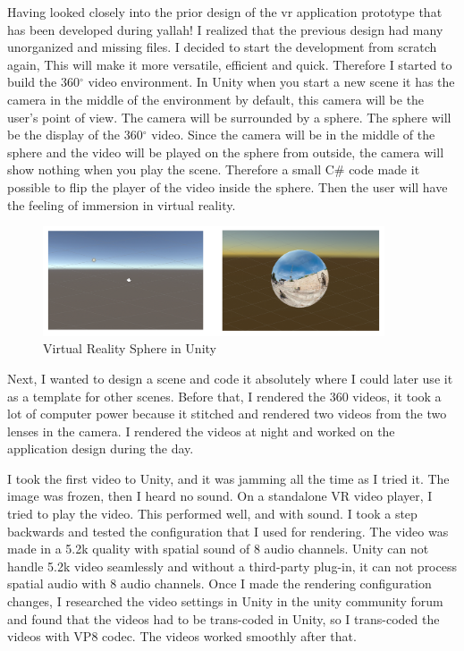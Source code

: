  Having looked closely into the prior design of the \acrshort{vr} application prototype that has been developed during \acrshort{yallah!} I realized that the previous design had many unorganized and missing files. I decided to start the development from scratch again, This will make it more versatile, efficient and quick. Therefore I started to build the 360$^{\circ}$ video environment. In Unity when you start a new scene it has the camera in the middle of the environment by default, this camera will be the user's point of view. The camera will be surrounded by a sphere. The sphere will be the display of the 360$^{\circ}$ video. Since the camera will be in the middle of the sphere and the video will be played on the sphere from outside, the camera will show nothing when you play the scene. Therefore a small C\# code made it possible to flip the player of the video inside the sphere. Then the user will have the feeling of immersion in virtual reality. 
\begin{figure}[ht]
    \centering
    \includegraphics[width=0.90\textwidth]{images/sphere.png}
    \caption{Virtual Reality Sphere in Unity }
    \label{fig:sphere}
\end{figure}


Next, I wanted to design a scene and code it absolutely where I could later use it as a template for other scenes. Before that, I rendered the 360 videos, it took a lot of computer power because it stitched and rendered two videos from the two lenses in the camera. I rendered the videos at night and worked on the application design during the day.

I took the first video to Unity, and it was jamming all the time as I tried it. The image was frozen, then I heard no sound. On a standalone VR video player, I tried to play the video. This performed well, and with sound. I took a step backwards and tested the configuration that I used for rendering. The video was made in a 5.2k quality with spatial sound of 8 audio channels. Unity can not handle 5.2k video seamlessly and without a third-party plug-in, it can not process spatial audio with 8 audio channels. Once I made the rendering configuration changes, I researched the video settings in Unity in the unity community forum and found that the videos had to be trans-coded in Unity, so I trans-coded the videos with VP8 codec. The videos worked smoothly after that. 

